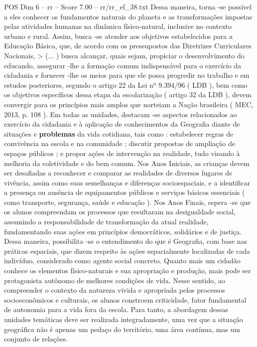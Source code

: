 \begin{textsample}{POS Dim 6 – rr – Score 7.00 – rr/rr\_ef\_38.txt}
Dessa maneira, torna -se possível a eles conhecer os fundamentos naturais do planeta e as transformações impostas pelas atividades humanas na dinâmica físico-natural, inclusive no contexto urbano e rural.
Assim, busca -se atender aos objetivos estabelecidos para a Educação Básica, que, de acordo com os pressupostos das Diretrizes Curriculares Nacionais, > (... ) busca alcançar, quais sejam, propiciar o desenvolvimento do educando, assegurar -lhe a formação comum indispensável para o exercício da cidadania e fornecer -lhe os meios para que ele possa progredir no trabalho e em estudos posteriores, segundo o artigo 22 da Lei nº 9.394/96 ( LDB ), bem como os objetivos específicos dessa etapa da escolarização ( artigo 32 da LDB ), devem convergir para os princípios mais amplos que norteiam a Nação brasileira ( MEC, 2013, p. 108 ).
Em todas as unidades, destacam -se aspectos relacionados ao exercício da cidadania e à aplicação de conhecimentos da Geografia diante de situações e \textbf{problemas} da vida cotidiana, tais como : estabelecer regras de convivência na escola e na comunidade ; discutir propostas de ampliação de espaços públicos ; e propor ações de intervenção na realidade, tudo visando à melhoria da coletividade e do bem comum.
Nos Anos Iniciais, as crianças devem ser desafiadas a reconhecer e comparar as realidades de diversos lugares de vivência, assim como suas semelhanças e diferenças socioespaciais, e a identificar a presença ou ausência de equipamentos públicos e serviços básicos essenciais ( como transporte, segurança, saúde e educação ).
Nos Anos Finais, espera -se que os alunos compreendam os processos que resultaram na desigualdade social, assumindo a responsabilidade de transformação da atual realidade, fundamentando suas ações em princípios democráticos, solidários e de justiça.
Dessa maneira, possibilita -se o entendimento do que é Geografia, com base nas práticas espaciais, que dizem respeito às ações espacialmente localizadas de cada indivíduo, considerado como agente social concreto.
Quanto mais um cidadão conhece os elementos físico-naturais e sua apropriação e produção, mais pode ser protagonista autônomo de melhores condições de vida.
Nesse sentido, ao compreender o contexto da natureza vivida e apropriada pelos processos socioeconômicos e culturais, os alunos constroem criticidade, fator fundamental de autonomia para a vida fora da escola.
Para tanto, a abordagem dessas unidades temáticas deve ser realizada integradamente, uma vez que a situação geográfica não é apenas um pedaço do território, uma área contínua, mas um conjunto de relações.

\end{textsample}
